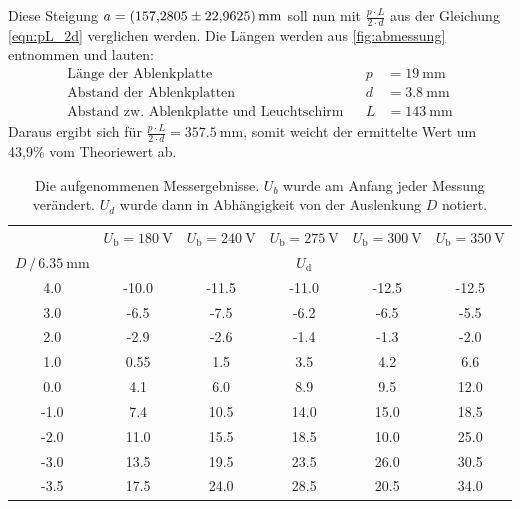 \noindent
Diese Steigung $a = \SI{157.2805 \pm 22.9625}{\milli\metre}$ soll nun mit $\frac{p \cdot L}{2\cdot d}$ aus der Gleichung \eqref{eqn:pL_2d} verglichen werden.
Die Längen werden aus \autoref{fig:abmessung} entnommen und lauten:
\begin{align*}
    \text{Länge der Ablenkplatte}& &p &= \SI{19}{\milli\metre} \\
    \text{Abstand der Ablenkplatten}& &d &= \SI{3.8}{\milli\metre} \\
    \text{Abstand zw. Ablenkplatte und Leuchtschirm}& &L &= \SI{143}{\milli\metre}
\end{align*}
Daraus ergibt sich für $\frac{p \cdot L}{2\cdot d} = \SI{357.5}{\milli\meter}$, somit weicht der ermittelte Wert um 43,9\% vom Theoriewert ab.

\begin{table}
    \centering
    \caption{Die aufgenommenen Messergebnisse. $U_b$ wurde am Anfang jeder Messung verändert. $U_d$ wurde dann in Abhängigkeit von der Auslenkung $D$ notiert.} 
    \label{tab:eFeldTeil1}
    \begin{tabular}{c c c c c c}%
        \toprule
        & $U_\text{b} = \SI{180}{\volt}$ & $U_\text{b} = \SI{240}{\volt}$&  $U_\text{b} = \SI{275}{\volt} $ & $U_\text{b} = \SI{300}{\volt}$ & $U_\text{b} = \SI{350}{\volt}$\\
      \cmidrule(lr){2-6}
      $ D \, / \, \SI{6,35}{\milli\metre}$ & \multicolumn{5}{c}{$U_\text{d}$}\\    %
      \midrule
      4.0 & -10.0 & -11.5 & -11.0 & -12.5 & -12.5 \\
      3.0 & -6.5 & -7.5 & -6.2 & -6.5 & -5.5 \\
      2.0 & -2.9 & -2.6 & -1.4 & -1.3 & -2.0 \\
      1.0 & 0.55 & 1.5 & 3.5 & 4.2 & 6.6 \\
      0.0 & 4.1 & 6.0 & 8.9 & 9.5 & 12.0 \\
      -1.0 & 7.4 & 10.5 & 14.0 & 15.0 & 18.5 \\
      -2.0 & 11.0 & 15.5 & 18.5 & 10.0 & 25.0 \\
      -3.0 & 13.5 & 19.5 & 23.5 & 26.0 & 30.5 \\
      -3.5 & 17.5 & 24.0 & 28.5 & 20.5 & 34.0 \\
      \bottomrule
    \end{tabular}
  \end{table}

